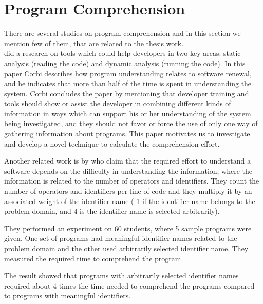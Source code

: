 \documentclass[12pt,mscthesis]{usiinfthesis}
\begin{document}
\section{Program Comprehension}
	There are several studies on program comprehension and in this section we mention few of them, that are related to the thesis work. \\


	\citet{Corbi:1989:PUC:97118.97124} did a research on tools which could help developers in two key areas: static analysis (reading the code) and dynamic analysis (running the code). In this paper Corbi describes how program understanding relates to software renewal, and he indicates that more than half of the time is spent in understanding the system. Corbi concludes the paper by mentioning that developer training and tools should show or assist the developer in combining  different kinds of information in ways which can support his or her understanding of the system being investigated, and they should not favor or force the use of only one way of gathering information about programs.
	This paper motivates us to investigate and develop a novel technique to calculate the comprehension effort.
	\newpage

	Another related work is by \citet{Kushwaha:2006:ICI:1163514.1163533}  who claim that the required effort to understand a software depends on the difficulty in understanding the information, where the information is related to the number of operators and identifiers. They count the number of operators and identifiers per line of code and they multiply it by an associated weight of the identifier name ( 1 if the identifier name belongs to the problem domain, and 4 is the identifier name is selected arbitrarily). 


	They performed an experiment on 60 students, where 5 sample programs were given. One set of programs had meaningful identifier names related to the problem domain and the other used arbitrarily selected identifier name. They measured the required time to comprehend the program.


	The result showed that programs with arbitrarily selected identifier names required about 4 times the time needed to comprehend the programs compared to programs with meaningful identifiers.\\
\end{document}
